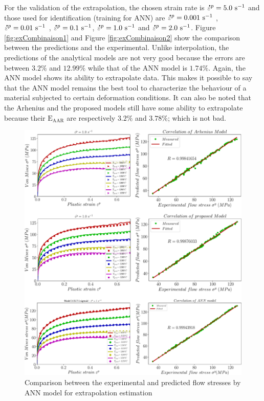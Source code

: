 \documentclass[twoside,english,1p,final,sort&compress]{elsarticle}
\theoremstyle{plain}
\newcommand{\mdot}[1]{\accentset{\mbox{\bfseries .}}{#1}}
\newcommand{\AARE}{\text{E}_\text{AAR}}
\begin{document}
For the validation of the extrapolation, the chosen strain rate is $\mdot{\varepsilon}^p = 5.0\ \text{s}^{-1}$ and those used for identification (training for ANN) are $\mdot{\varepsilon}^p = 0.001\ \text{s}^{-1}$ , $\mdot{\varepsilon}^p = 0.01\ \text{s}^{-1}$ , $\mdot{\varepsilon}^p = 0.1\ \text{s}^{-1}$, $\mdot{\varepsilon}^p = 1.0\ \text{s}^{-1}$  and $\mdot{\varepsilon}^p = 2.0\ \text{s}^{-1}$. Figure \ref{fig:exCombinaison1} and Figure \ref{fig:exCombinaison2} show the comparison between the predictions  and the experimental. Unlike interpolation, the predictions of the analytical models are not very good because the errors are between $3.2\%$ and $12.99\%$ while that of the ANN model is $1.74\%$. Again, the ANN model shows its ability to extrapolate data. This makes it possible to say that the ANN model remains the best tool to characterize the behaviour of a material subjected to certain deformation conditions. It can also be noted that the Arhenius and the proposed models still have some ability to extrapolate because their $\AARE$ are respectively $ 3.2 \% $ and $ 3.78 \%$; which is not bad.
\begin{figure}[!ht]
\centering
\includegraphics[width=1.02\columnwidth]
{newFigures/inCombinaison2}
\caption{Comparison between the experimental and predicted flow stresses by ANN model for extrapolation estimation}
\label{fig:inCombinaison2}
\end{figure}
\end{document}
